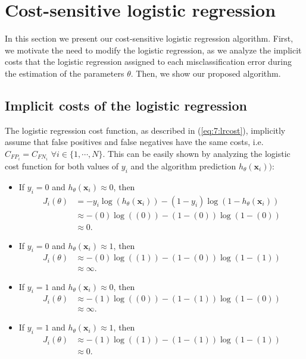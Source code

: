 \section{Cost-sensitive logistic regression}
\label{sec:7:cslr}

In this section we present our cost-sensitive logistic regression algorithm.
First, we motivate the need to modify the logistic regression, as we 
analyze the implicit costs that the logistic regression assigned to each misclassification error 
during the estimation of the parameters $\theta$. Then, we show our proposed algorithm.


\subsection{Implicit costs of the logistic regression}
\label{sec:7:log_cost_analysis}

The logistic regression cost function, as described in (\ref{eq:7:lrcost}), implicitly assume that 
false positives and false negatives have the same costs, i.e. $C_{{FP}_i} = C_{{FN}_i}$ $\forall 
i \in \{1,\cdots,N\}$. This can be easily shown by analyzing the logistic cost function for both 
values of $y_i$ and the algorithm prediction $h_\theta(\mathbf{x}_i))$:

\begin{itemize}
\item If $y_i=0$ and $h_\theta(\mathbf{x}_i) \approx 0$, then
\begin{align*}
 J_i(\theta) &= -y_i\log(h_\theta(\mathbf{x}_i)) -(1-y_i)\log(1-h_\theta(\mathbf{x}_i)) \nonumber \\
 &\approx -(0)\log((0)) -(1-(0))\log(1-(0)) \nonumber \\
 &\approx 0.
\end{align*}

\item If $y_i=0$ and $h_\theta(\mathbf{x}_i) \approx 1$, then
\begin{align*}
 J_i(\theta) &\approx -(0)\log((1)) -(1-(0))\log(1-(1)) \nonumber \\
 &\approx \infty.
\end{align*}

\item If $y_i=1$ and $h_\theta(\mathbf{x}_i) \approx 0$, then
\begin{align*}
 J_i(\theta) &\approx -(1)\log((0)) -(1-(1))\log(1-(0)) \nonumber \\
 &\approx \infty.
\end{align*}

\item If $y_i=1$ and $h_\theta(\mathbf{x}_i) \approx 1$, then
\begin{align*}
 J_i(\theta) &\approx -(1)\log((1)) -(1-(1))\log(1-(1)) \nonumber \\
 &\approx 0.
\end{align*}
\end{itemize}

